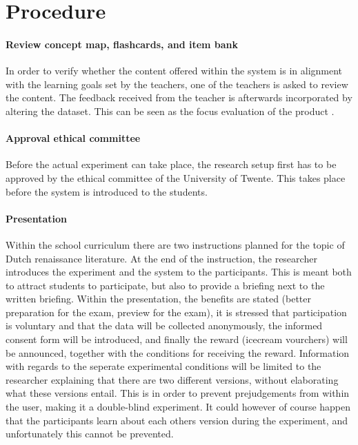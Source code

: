 \section{Procedure}
\label{sec:procedure}

\paragraph{Review concept map, flashcards, and item bank} In order to verify whether the content offered within the system is in alignment with the learning goals set by the teachers, one of the teachers is asked to review the content. The feedback received from the teacher is afterwards incorporated by altering the dataset. This can be seen as the focus evaluation of the product \cite{slo}.

\paragraph{Approval ethical committee} Before the actual experiment can take place, the research setup first has to be approved by the ethical committee of the University of Twente. This takes place before the system is introduced to the students.

\paragraph{Presentation} Within the school curriculum there are two instructions planned for the topic of Dutch renaissance literature. At the end of the instruction, the researcher introduces the experiment and the system to the participants. This is meant both to attract students to participate, but also to provide a briefing next to the written briefing. Within the presentation, the benefits are stated (better preparation for the exam, preview for the exam), it is stressed that participation is voluntary and that the data will be collected anonymously, the informed consent form will be introduced, and finally the reward (icecream vourchers) will be announced, together with the conditions for receiving the reward. Information with regards to the seperate experimental conditions will be limited to the researcher explaining that there are two different versions, without elaborating what these versions entail. This is in order to prevent prejudgements from within the user, making it a double-blind experiment. It could however of course happen that the participants learn about each others version during the experiment, and unfortunately this cannot be prevented.

